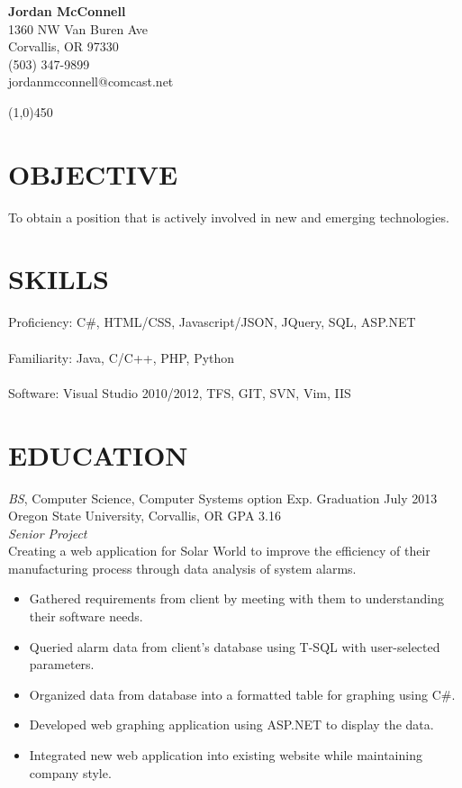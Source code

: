 \documentclass{res}
\begin{document}
\begin{resume}
{\centering
{\Large \bf Jordan McConnell} \\
1360 NW Van Buren Ave \\
Corvallis, OR 97330 \\
(503) 347-9899 \\
jordanmcconnell@comcast.net
\par
}
\begin{center}
\line(1,0){450}
\end{center}

\section{OBJECTIVE}
\vspace{8pt} %
To obtain a position that is actively involved in new and emerging technologies.
\vspace{0.2in}
\section{SKILLS}
\vspace{8pt}
Proficiency: C\#, HTML/CSS, Javascript/JSON, JQuery, SQL, ASP.NET
\\
\\
Familiarity: Java, C/C++, PHP, Python
\\
\\
Software: Visual Studio 2010/2012, TFS, GIT, SVN, Vim, IIS

\vspace{0.2in}
\section{EDUCATION}
\vspace{8pt}
{\sl BS}, Computer Science, Computer Systems option \hfill Exp. Graduation July 2013\\
Oregon State University, Corvallis, OR \hfill GPA 3.16 \\

{\sl Senior Project}\\
Creating a web application for Solar World to improve the efficiency of their manufacturing process through data analysis of system alarms.
    \begin{itemize} \itemsep -1pt
    \item Gathered requirements from client by meeting with them to understanding their software needs.
    \item Queried alarm data from client's database using T-SQL with user-selected parameters.
    \item Organized data from database into a formatted table for graphing using C\#.
    \item Developed web graphing application using ASP.NET to display the data.
    \item Integrated new web application into existing website while maintaining company style.
    \end{itemize}


\end{resume}
\end{document}

